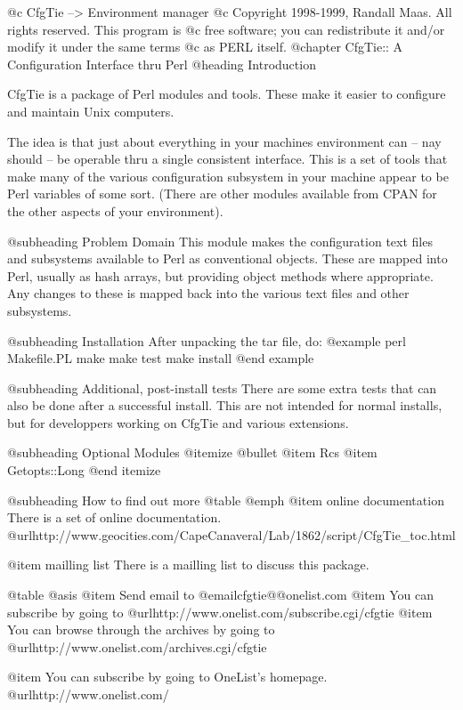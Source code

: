 @c CfgTie --> Environment manager
@c Copyright 1998-1999, Randall Maas.  All rights reserved.  This program is
@c free software; you can redistribute it and/or modify it under the same terms
@c as PERL itself.                                                                   
@chapter CfgTie:: A Configuration Interface thru Perl
@heading Introduction

CfgTie is a package of Perl modules and tools.  These make it easier to
configure and maintain Unix computers.

The idea is that just about everything in your machines environment can --
nay should -- be operable thru a single consistent interface.  This is a
set of tools that make many of the various configuration subsystem in your
machine appear to be Perl variables of some sort.  (There are other modules
available from CPAN for the other aspects of your environment).

@subheading Problem Domain
This module makes the configuration text files and subsystems available to
Perl as conventional objects.  These are mapped into Perl, usually as hash
arrays, but providing object methods where appropriate.  Any changes to these
is mapped back into the various text files and other subsystems.

@subheading Installation
After unpacking the tar file, do:
@example
        perl Makefile.PL 
        make 
        make test
        make install
@end example

@subheading Additional, post-install tests
There are some extra tests that can also be done after a successful install.
This are not intended for normal installs, but for developpers working on
CfgTie and various extensions.

@subheading Optional Modules
@itemize @bullet
@item Rcs
@item Getopts::Long
@end itemize

@subheading How to find out more
@table @emph
@item online documentation
There is a set of online documentation.
@url{http://www.geocities.com/CapeCanaveral/Lab/1862/script/CfgTie_toc.html}

@item mailling list
There is a mailling list to discuss this package.

@table @asis
@item Send email to @email{cfgtie@@onelist.com}
@item You can subscribe by going to
@url{http://www.onelist.com/subscribe.cgi/cfgtie}
@item You can browse through the archives by going to
 @url{http://www.onelist.com/archives.cgi/cfgtie}

@item You can subscribe by going to OneList's homepage.
 @url{http://www.onelist.com/}

